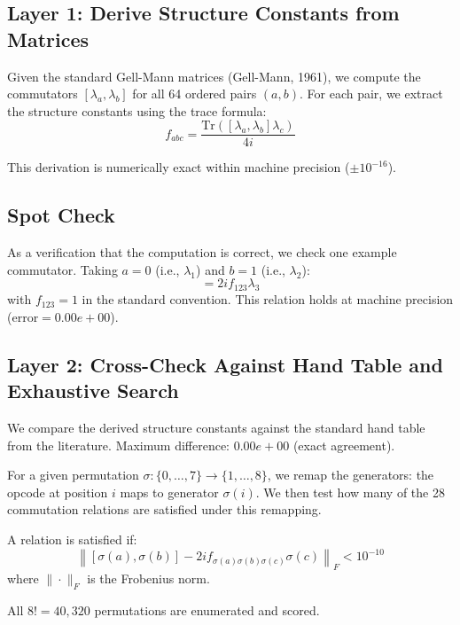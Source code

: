 \documentclass[11pt,a4paper]{article}
\begin{document}
\subsection{Layer 1: Derive Structure Constants from Matrices}

Given the standard Gell-Mann matrices (Gell-Mann, 1961), we compute the commutators $[\lambda_a, \lambda_b]$ for all 64 ordered pairs $(a, b)$. For each pair, we extract the structure constants using the trace formula:
\begin{equation}
f_{abc} = \frac{\text{Tr}([\lambda_a, \lambda_b] \lambda_c)}{4i}
\end{equation}

This derivation is numerically exact within machine precision ($\pm 10^{-16}$).

\subsection{Spot Check}

As a verification that the computation is correct, we check one example commutator. Taking $a = 0$ (i.e., $\lambda_1$) and $b = 1$ (i.e., $\lambda_2$):
\begin{equation}
[\lambda_1, \lambda_2] = 2i f_{123} \lambda_3
\end{equation}
with $f_{123} = 1$ in the standard convention. This relation holds at machine precision ($\text{error} = 0.00e+00$).

\subsection{Layer 2: Cross-Check Against Hand Table and Exhaustive Search}

We compare the derived structure constants against the standard hand table from the literature. Maximum difference: $0.00e+00$ (exact agreement).

For a given permutation $\sigma: \{0, \ldots, 7\} \to \{1, \ldots, 8\}$, we remap the generators: the opcode at position $i$ maps to generator $\sigma(i)$. We then test how many of the 28 commutation relations are satisfied under this remapping.

A relation is satisfied if:
\begin{equation}
\left\|[\sigma(a), \sigma(b)] - 2i f_{\sigma(a)\sigma(b)\sigma(c)} \sigma(c)\right\|_F < 10^{-10}
\end{equation}
where $\|\cdot\|_F$ is the Frobenius norm.

All $8! = 40,320$ permutations are enumerated and scored.
\end{document}

